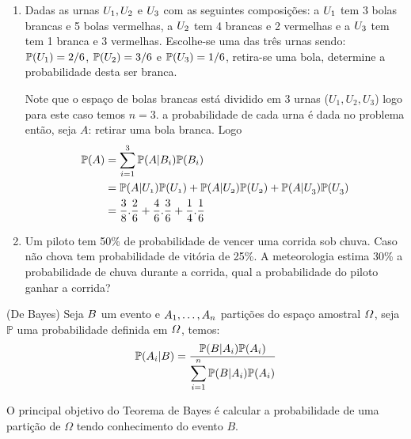 \exemplo
	 \begin{enumerate}
	     \item [(i)] Dadas as urnas $\mathnormal{U}_1, \mathnormal{U}_2$ e $\mathnormal{U}_3$ com as seguintes composições: a $\mathnormal{U}_1$ tem 3 bolas brancas e 5 bolas vermelhas, a $\mathnormal{U}_2$ tem 4 brancas e 2 vermelhas e a $\mathnormal{U}_3$ tem tem 1 branca e 3 vermelhas. Escolhe-se uma das três urnas sendo: $\mathbb{P}(\mathnormal{U}_1) = 2/6$, $\mathbb{P}(\mathnormal{U}_2) = 3/6$ e $\mathbb{P}(\mathnormal{U}_3) = 1/6$, retira-se uma bola, determine a probabilidade desta ser branca. 
	     
	     \inic Note que o espaço de bolas brancas está dividido em 3 urnas ($U_1, U_2, U_3$) logo para este caso temos $n=3$. a probabilidade de cada urna é dada no problema então, seja $A$: retirar uma bola branca. Logo
	         \begin{align*}
	              \mathbb{P}(\mathnormal{A}) &= \displaystyle \sum_{\mathnormal{i}=1}^{\mathnormal{3}}\mathbb{P}(\mathnormal{A|B_i})\mathbb{P}(\mathnormal{B_i})\\
	              &= \displaystyle \mathbb{P}(\mathnormal{A|U_1})\mathbb{P}(\mathnormal{U_1}) + \mathbb{P}(\mathnormal{A|U_2})\mathbb{P}(\mathnormal{U_2}) + \mathbb{P}(\mathnormal{A|U_3})\mathbb{P}(\mathnormal{U_3})\\
	              &= \dfrac{3}{8}.\dfrac{2}{6} + \dfrac{4}{6}.\dfrac{3}{6} + \dfrac{1}{4}.\dfrac{1}{6}
	         \end{align*}
	     
	     \item[(ii)] Um piloto tem 50\% de probabilidade de vencer uma corrida sob chuva. Caso não chova tem probabilidade de vitória de 25\%. A meteorologia estima 30\% a probabilidade de chuva durante a corrida, qual a probabilidade do piloto ganhar a corrida?
	 \end{enumerate}
	
\begin{teo}{(De Bayes)}
Seja $\mathnormal{B}$ um evento e $\mathnormal{A}_1,\dots, \mathnormal{A_n}$ partições do espaço amostral $\mathnormal{\Omega}$, seja $\mathbb{P}$ uma probabilidade definida em $\mathnormal{\Omega}$, temos:
	\begin{equation*}
		\mathbb{P}(\mathnormal{A_i|B}) = \frac{\mathbb{P}(\mathnormal{B|A_i})\mathbb{P}(\mathnormal{A_i})}{\displaystyle \sum_{\mathnormal{i}=1}^{\mathnormal{n}}\mathbb{P}(\mathnormal{B|A_i})\mathbb{P}(\mathnormal{A_i})}
	\end{equation*} 
\end{teo}
\inic O principal objetivo do Teorema de Bayes é calcular a probabilidade de uma partição de $\Omega$ tendo conhecimento do evento $B$.

